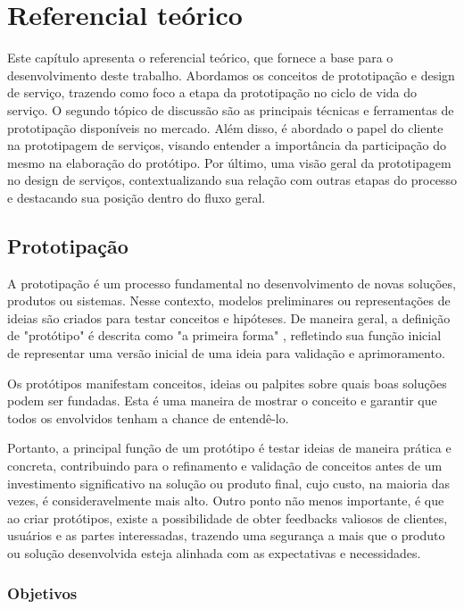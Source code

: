 \chapter[Referencial teórico]{Referencial teórico}

Este capítulo apresenta o referencial teórico, que fornece a base para o desenvolvimento deste trabalho. Abordamos os conceitos de prototipação e design de serviço, trazendo como foco a etapa da prototipação no ciclo de vida do serviço. O segundo tópico de discussão são as principais técnicas e ferramentas de prototipação disponíveis no mercado. Além disso, é abordado o papel do cliente na prototipagem de serviços, visando entender a importância da participação do mesmo na elaboração do protótipo. Por último, uma visão geral da prototipagem no design de serviços, contextualizando sua relação com outras etapas do processo e destacando sua posição dentro do fluxo geral.  

\section{Prototipação}

A prototipação é um processo fundamental no desenvolvimento de novas soluções, produtos ou sistemas. Nesse contexto, modelos preliminares ou representações de ideias são criados para testar conceitos e hipóteses. De maneira geral, a definição de "protótipo" é descrita como "a primeira forma" \cite{Blomkvist2011existing}, refletindo sua função inicial de representar uma versão inicial de uma ideia para validação e aprimoramento.

Os protótipos manifestam conceitos, ideias ou palpites sobre quais boas soluções podem ser fundadas. Esta é uma maneira de mostrar o conceito e garantir que todos os envolvidos tenham a chance de entendê-lo. \cite{Blomkvist2014}

Portanto, a principal função de um protótipo é testar ideias de maneira prática e concreta, contribuindo para o refinamento e validação de conceitos antes de um investimento significativo na solução ou produto final, cujo custo, na maioria das vezes, é consideravelmente mais alto. Outro ponto não menos importante, é que ao criar protótipos, existe a possibilidade de obter feedbacks valiosos de clientes, usuários e as partes interessadas, trazendo uma segurança a mais que o produto ou solução desenvolvida esteja alinhada com as expectativas e necessidades.

\subsection{Objetivos}

